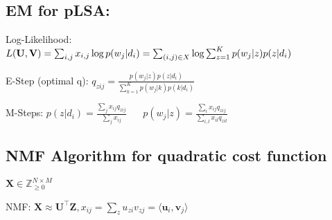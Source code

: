 \documentclass[a4paper, 11pt, landscape]{article}
\begin{document}
\begin{multicols*}{3}

\subsection{EM for pLSA:}
\begin{compactenum}
  \item Log-Likelihood: $L(\mathbf{U}, \mathbf{V}) = \sum_{i,j} x_{i,j}\log p(w_j|d_i) = \break \sum_{(i,j) \in X} \log \sum_{z=1}^K p(w_j|z)p(z|d_i)$
	\item E-Step (optimal q): $q_{zij} = \frac{p(w_j|z)p(z|d_i)}{\sum_{k=1}^K p(w_j|k)p(k|d_i)}$
	\item M-Steps: $p(z|d_i) = \frac{\sum_j x_{ij}q_{zij}}{\sum_j x_{ij}} \hspace{20pt} p(w_j|z) = \frac{\sum_i x_{ij}q_{zij}}{\sum_{i,l}x_{il}q_{zil}}$
\end{compactenum}

\subsection{NMF Algorithm for quadratic cost function}
\begin{inparaitem}[\color{red}\textbullet]
	\item $\mathbf{X} \in \mathbb{Z}^{N \times M}_{\geq 0}$
	\item NMF: $\mathbf{X} \approx \mathbf{U^\top Z}, x_{ij} = \sum_z u_{zi}v_{zj} = \langle \mathbf{u}_i, \mathbf{v}_j \rangle$
\end{inparaitem}


\end{multicols*}
\end{document}
